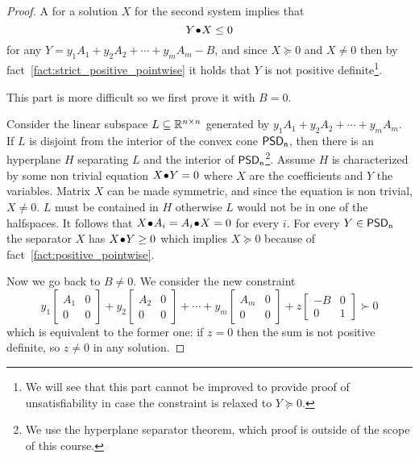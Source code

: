 \documentclass[a4paper,twoside,justified]{tufte-handout}
\begin{document}
\begin{proof}

   A for a solution $X$ for the second system
  implies that
  \begin{equation}
    \pointwiseprod{Y}{X}
    \leq 0
  \end{equation}
  for any $ Y=y_{1}A_{1}+y_{2}A_{2} + \cdots + y_{m}A_{m}-B $, and
  since $ X\succeq 0 $ and $ X\not=0 $ then by
  fact~\ref{fact:strict_positive_pointwise} it holds that $ Y $ is not
  positive definite\footnote{We will see that this part cannot be
    improved to provide proof of unsatisfiability in case the
    constraint is relaxed to $ Y\succeq 0 $.}.

   This part is more difficult so we first prove
  it with $ B=0 $.

  Consider the linear subspace $ L\subseteq\RR^{n \times n} $
  generated by $y_{1}A_{1}+y_{2}A_{2} + \cdots + y_{m}A_{m}$.
  If $ L $ is disjoint from the interior of the convex cone $
  \positivesemidefinite[n] $, then there is an hyperplane $ H $
  separating $ L $ and the interior of
  $\positivesemidefinite$\footnote{We use the hyperplane separator
    theorem, which proof is outside of the scope of this course.}.
  Assume $H$ is characterized by some non trivial equation $
  \pointwiseprod{X}{Y}=0$ where $ X $ are the coefficients and $ Y $
  the variables. Matrix $ X $ can be made symmetric, and since the
  equation is non trivial, $ X\not=0 $.
  $ L $ must be contained in $H$ otherwise $ L $ would not be in one
  of the halfspaces. It follows that $ \pointwiseprod{X}{A_{i}}=
  \pointwiseprod{A_{i}}{X}=0 $ for every $ i $. 
  For every $ Y\in\positivesemidefinite[n] $ the separator $ X $ has $
  \pointwiseprod{X}{Y}\geq 0 $ which implies $ X \succeq 0 $
  because of fact~\ref{fact:positive_pointwise}.  
 
  Now we go back to $ B\not=0$. We consider the new constraint
  \begin{equation}
    y_{1}\begin{bmatrix}A_{1} & 0\\ 0 & 0\end{bmatrix}
    +y_{2}\begin{bmatrix}A_{2} & 0\\ 0 & 0\end{bmatrix} + \cdots
    +y_{m}\begin{bmatrix}A_{m} & 0\\ 0 & 0\end{bmatrix} 
    + z \begin{bmatrix} -B & 0\\ 0 & 1\end{bmatrix} \succ 0
  \end{equation}
  which is equivalent to the former one: if $ z=0 $ then the sum
  is not positive definite, so $ z\not=0 $ in any solution. 


\end{proof}
\end{document}
